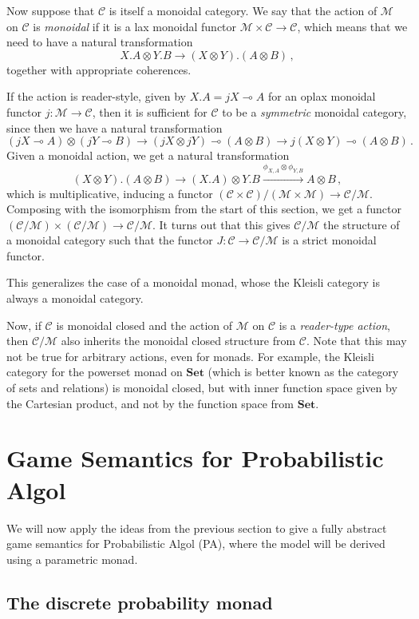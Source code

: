 \documentclass{svproc}
\newcommand\C{\mathcal{C}}
\newcommand\M{\mathcal{M}}
\newcommand\tensor\otimes
\renewcommand\implies\multimap
\newcommand*\from{\colon}
\newcommand{\0}{{\mathtt{0}}} \newcommand{\com}{{\mathtt{com}}}
\newcommand{\catname}[1]{\mathbf{#1}}
\newcommand{\Set}{\catname{Set}}
\begin{document}
Now suppose that $\C$ is itself a monoidal category.  
We say that the action of $\M$ on $\C$ is \emph{monoidal} if it is a lax monoidal functor $\M\times\C\to\C$, which means that we need to have a natural transformation 
\[
  X.A\tensor Y.B\to (X\tensor Y).(A\tensor B)\,,
  \]
together with appropriate coherences.  

If the action is reader-style, given by $X.A = jX \implies A$ for an oplax monoidal functor $j\from \M\to \C$, then it is sufficient for $\C$ to be a \emph{symmetric} monoidal category, since then we have a natural transformation
\[
  (j X \implies A) \tensor (j Y \implies B)
  \rightarrow
  (j X \tensor j Y) \implies (A \tensor B)
  \rightarrow
  j (X\tensor Y) \implies (A \tensor B)\,.
  \]
Given a monoidal action, we get a natural transformation
\[
  (X\tensor Y).(A\tensor B)
  \rightarrow
  (X.A)\tensor Y.B
  \xrightarrow{\phi_{X,A}\tensor \phi_{Y,B}}
  A\tensor B\,,
  \]
which is multiplicative, inducing a functor $(\C\times\C)/(\M\times\M)\to \C/\M$.  
Composing with the isomorphism from the start of this section, we get a functor $(\C/\M)\times(\C/\M)\to\C/\M$.  
It turns out that this gives $\C/\M$ the structure of a monoidal category such that the functor $J\from \C\to\C/\M$ is a strict monoidal functor.

This generalizes the case of a monoidal monad, whose the Kleisli category is always a monoidal category.

Now, if $\C$ is monoidal closed and the action of $\M$ on $\C$ is a \emph{reader-type action}, then $\C/\M$ also inherits the monoidal closed structure from $\C$.  
Note that this may not be true for arbitrary actions, even for monads.  
For example, the Kleisli category for the powerset monad on $\Set$ (which is better known as the category of sets and relations) is monoidal closed, but with inner function space given by the Cartesian product, and not by the function space from $\Set$.

\section{Game Semantics for Probabilistic Algol}

We will now apply the ideas from the previous section to give a fully abstract game semantics for Probabilistic Algol (PA), where the model will be derived using a parametric monad.

\subsection{The discrete probability monad}
\end{document}
